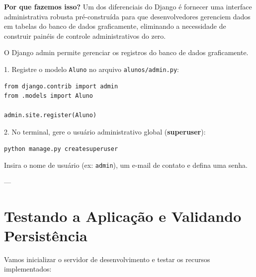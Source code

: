 \documentclass[12pt,a4paper]{article}
\begin{document}
\newpage

\begin{boxAtividade}
\textbf{Por que fazemos isso?} Um dos diferenciais do Django é fornecer uma interface administrativa robusta pré-construída para que desenvolvedores gerenciem dados em tabelas do banco de dados graficamente, eliminando a necessidade de construir painéis de controle administrativos do zero.

O Django admin permite gerenciar os registros do banco de dados graficamente.

1. Registre o modelo \texttt{Aluno} no arquivo \texttt{alunos/admin.py}:
\begin{boxCodigo}
\begin{verbatim}
from django.contrib import admin
from .models import Aluno

admin.site.register(Aluno)
\end{verbatim}
\end{boxCodigo}

2. No terminal, gere o usuário administrativo global (\textbf{superuser}):
\begin{boxCodigo}
\begin{verbatim}
python manage.py createsuperuser
\end{verbatim}
\end{boxCodigo}
Insira o nome de usuário (ex: \texttt{admin}), um e-mail de contato e defina uma senha.
\end{boxAtividade}

---

\section{Testando a Aplicação e Validando Persistência}

Vamos inicializar o servidor de desenvolvimento e testar os recursos implementados:
\end{document}

